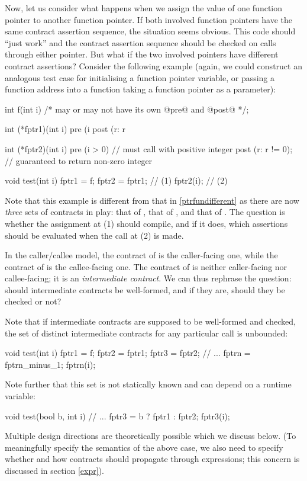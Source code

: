 Now, let us consider what happens when we assign the value of one function pointer to another function pointer. If both involved function pointers have the same contract assertion sequence, the situation seems obvious. This code should ``just work'' and the contract assertion sequence should be checked on calls through either pointer. But what if the two involved pointers have different contract assertions? Consider the following example (again, we could construct an analogous test case for initialising a function pointer variable, or passing a function address into a function taking a function pointer as a parameter):
\begin{codeblock}
int f(int i) /* may or may not have its own @pre@ and @post@ */;

int (*fptr1)(int i)
  pre (i %
  post (r: r %

int (*fptr2)(int i)
  pre (i > 0)           // must call with positive integer
  post (r: r != 0);     // guaranteed to return non-zero integer

void test(int i) {
  fptr1 = f;
  fptr2 = fptr1;  // (1)
  fptr2(i);       // (2)
}
\end{codeblock}
Note that this example is different from that in \ref{ptrfundifferent} as there are now \emph{three} sets of contracts in play: that of , that of , and that of . The question is whether the assignment at (1) should compile, and if it does, which assertions should be evaluated when the call at (2) is made. 

In the caller/callee model, the contract of  is the caller-facing one, while the contract  of  is the callee-facing one. The contract of  is neither caller-facing nor callee-facing; it is an \emph{intermediate contract}. We can thus rephrase the question: should intermediate contracts be well-formed, and if they are, should they be checked or not?

Note that if intermediate contracts are supposed to be well-formed and checked, the set of distinct intermediate contracts for any particular call is unbounded:
\begin{codeblock}
void test(int i) {
  fptr1 = f;
  fptr2 = fptr1; 
  fptr3 = fptr2;
  // ...
  fptrn = fptrn_minus_1;
  fptrn(i);
}
\end{codeblock}
Note further that this set is not statically known and can depend on a runtime variable:
\begin{codeblock}
void test(bool b, int i) {
  // ...
  fptr3 = b ? fptr1 : fptr2;
  fptr3(i);
}
\end{codeblock}
Multiple design directions are theoretically possible which we discuss below. (To meaningfully specify the semantics of the above case, we also need to specify whether and how contracts should propagate through expressions; this concern is discussed in section \ref{expr}).

